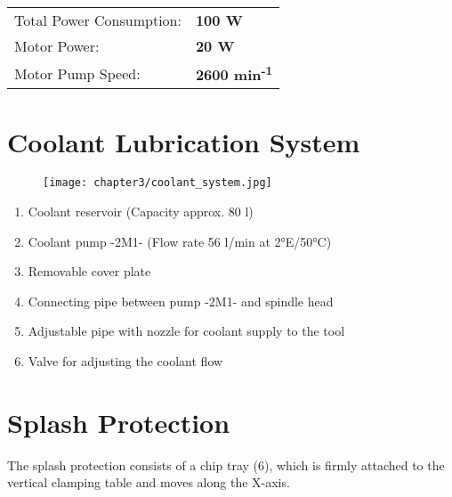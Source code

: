 \vspace{1cm}

\begin{tabular}{ll}
    Total Power Consumption: & \textbf{100 W} \\
    Motor Power: & \textbf{20 W} \\
    Motor Pump Speed: & \textbf{2600 min\textsuperscript{-1}}
\end{tabular}

\section{Coolant Lubrication System}

\setcounter{section}{22}

\begin{figure}[h]
    \centering
    \texttt{[image: chapter3/coolant\_system.jpg]}
\end{figure}

\begin{enumerate}
    \item Coolant reservoir (Capacity approx. 80 l)\footnotemark
    \item Coolant pump -2M1- (Flow rate 56 l/min at 2°E/50°C)\footnotemark
    \item Removable cover plate
    \item Connecting pipe between pump -2M1- and spindle head
    \item Adjustable pipe with nozzle for coolant supply to the tool\footnotemark
    \item Valve for adjusting the coolant flow
\end{enumerate}


\section{Splash Protection}

\setcounter{section}{24}

The splash protection consists of a chip tray (6), which is firmly attached to the vertical clamping table and moves along the X-axis.


